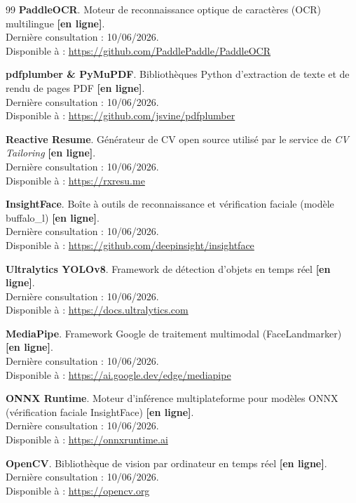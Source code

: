 \begin{thebibliography}{99}
\textbf{PaddleOCR}. Moteur de reconnaissance optique de caractères (OCR) multilingue \textbf{[en ligne]}.\\
Dernière consultation : 10/06/2026.\\
Disponible à : \url{https://github.com/PaddlePaddle/PaddleOCR}

\textbf{pdfplumber \& PyMuPDF}. Bibliothèques Python d'extraction de texte et de rendu de pages PDF \textbf{[en ligne]}.\\
Dernière consultation : 10/06/2026.\\
Disponible à : \url{https://github.com/jsvine/pdfplumber}

\textbf{Reactive Resume}. Générateur de CV open source utilisé par le service de \textit{CV Tailoring} \textbf{[en ligne]}.\\
Dernière consultation : 10/06/2026.\\
Disponible à : \url{https://rxresu.me}

\textbf{InsightFace}. Boîte à outils de reconnaissance et vérification faciale (modèle buffalo\_l) \textbf{[en ligne]}.\\
Dernière consultation : 10/06/2026.\\
Disponible à : \url{https://github.com/deepinsight/insightface}

\textbf{Ultralytics YOLOv8}. Framework de détection d'objets en temps réel \textbf{[en ligne]}.\\
Dernière consultation : 10/06/2026.\\
Disponible à : \url{https://docs.ultralytics.com}

\textbf{MediaPipe}. Framework Google de traitement multimodal (FaceLandmarker) \textbf{[en ligne]}.\\
Dernière consultation : 10/06/2026.\\
Disponible à : \url{https://ai.google.dev/edge/mediapipe}

\textbf{ONNX Runtime}. Moteur d'inférence multiplateforme pour modèles ONNX (vérification faciale InsightFace) \textbf{[en ligne]}.\\
Dernière consultation : 10/06/2026.\\
Disponible à : \url{https://onnxruntime.ai}

\textbf{OpenCV}. Bibliothèque de vision par ordinateur en temps réel \textbf{[en ligne]}.\\
Dernière consultation : 10/06/2026.\\
Disponible à : \url{https://opencv.org}


\end{thebibliography}
